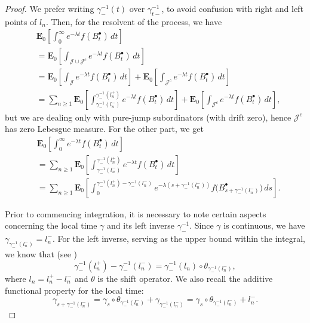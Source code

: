 \documentclass[11pt,a4paper]{article}
\theoremstyle{plain}
\theoremstyle{definition}
\theoremstyle{remark}
\begin{document}
\begin{proof}
			We prefer writing $\gamma_{-}^{-1}(t)$ over $\gamma_{t-}^{-1}$, to avoid confusion with right and left points of $l_n$. Then, for the resolvent of the process, we have
			\begin{align*}
				&\mathbf{E}_{0}  \left[\int_0^\infty e^{-\lambda t} f(B^\bullet_t)\,dt\right]\\
				&= \mathbf{E}_{0}  \left[\int_{\mathcal{J}\cup \mathcal{J}^c} e^{-\lambda t} f(B^\bullet_t)\,dt\right]\\
				&=\mathbf{E}_{0}  \left[\int_{\mathcal{J}} e^{-\lambda t} f(B^\bullet_t)\,dt\right] + \mathbf{E}_{0}  \left[\int_{\mathcal{J}^c} e^{-\lambda t} f(B^\bullet_t)\,dt\right]\\
				&=\sum_{n \geq 1} \mathbf{E}_{0}  \left[\int_{\gamma_{-}^{-1}(l_n^-)}^{\gamma_{-}^{-1}(l_n^+)} e^{-\lambda t} f(B^\bullet_t)\,dt\right] + \mathbf{E}_{0}  \left[\int_{\mathcal{J}^c} e^{-\lambda t} f(B^\bullet_t)\,dt\right],
			\end{align*}
			but we are dealing only with pure-jump subordinators (with drift zero), hence $\mathcal{J}^c$ has zero Lebesgue measure. For the other part, we get
			\begin{align*}
				&\mathbf{E}_{0}  \left[\int_0^\infty e^{-\lambda t} f(B^\bullet_t)\,dt\right]\\
				&=\sum_{n \geq 1} \mathbf{E}_{0}  \left[\int_{\gamma_{-}^{-1}(l_n^-)}^{\gamma_{-}^{-1}(l_n^+)} e^{-\lambda t} f(B^\bullet_t)\,dt\right]\\
				&=\sum_{n \geq 1}  \mathbf{E}_{0} \left[\int_0^{\gamma_{-}^{-1}(l_n^+)-\gamma_{-}^{-1}(l_n^-)} e^{-\lambda (s + \gamma_{-}^{-1}(l_n^-))} f\big(B^\bullet_{s + \gamma_{-}^{-1}(l_n^-)}\big)\,ds\right].
			\end{align*}
			
			Prior to commencing integration, it is necessary to note certain aspects concerning the local time $\gamma$ and its left inverse $\gamma_{-}^{-1}$. Since $\gamma$ is continuous, we have $\gamma_{\gamma^{-1}_{-}(l_n^-)}=l_n^-$. For the left inverse, serving as the upper bound within the integral, we know that (see \cite[Proposition 1.3, Chapter X]{revuz-yor})
			\[
			\gamma^{-1}_{-}(l_n^+) - \gamma_{-}^{-1}(l_n^-)
			= \gamma_{-}^{-1}(l_n) \circ \theta_{\gamma^{-1}_{-}(l_n^-)} ,
			\]
			where \(l_n=l_n^+ - l_n^-\) and \(\theta\) is the shift operator. We also recall the additive functional property for the local time:
			\[
			\gamma_{s+\gamma^{-1}_{-}(l_n^-)}=\gamma_s \circ \theta_{\gamma^{-1}_{-}(l_n^-)} + \gamma_{\gamma^{-1}_{-}(l_n^-)}
			= \gamma_s \circ \theta_{\gamma^{-1}_{-}(l_n^-)} + l_n^- .
			\]
			

\end{proof}
\end{document}
